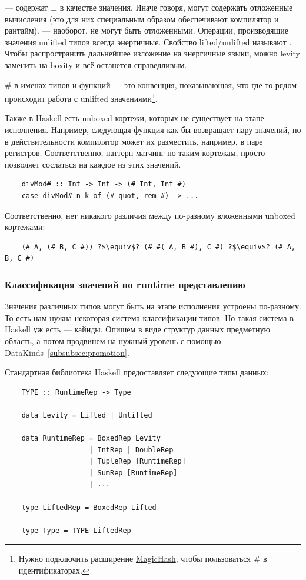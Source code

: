  --- содержат $\bot$ в качестве значения.
Иначе говоря, могут содержать отложенные вычисления (это для них специальным образом обеспечивают компилятор и рантайм).
 --- наоборот, не могут быть отложенными.
Операции, производящие значения unlifted типов всегда энергичные.
Свойство lifted/unlifted называют .
Чтобы распространить дальнейшее изложение на энергичные языки, можно levity заменить на boxity и всё останется справедливым.

\# в именах типов и функций --- это конвенция, показывающая, что где-то рядом происходит работа с unlifted значениями\footnote{Нужно подключить расширение \href{https://ghc.gitlab.haskell.org/ghc/doc/users_guide/exts/magic_hash.html}{MagicHash}, чтобы пользоваться \# в идентификаторах.}.

Также в Haskell есть unboxed кортежи, которых не существует на этапе исполнения.
Например, следующая функция как бы возвращает пару значений, но в действительности компилятор может их разместить, например, в паре регистров.
Соответственно, паттерн-матчинг по таким кортежам, просто позволяет сослаться на каждое из этих значений.
\begin{verbatim}
    divMod# :: Int -> Int -> (# Int, Int #)
    case divMod# n k of (# quot, rem #) -> ...
\end{verbatim}
Соответственно, нет никакого различия между по-разному вложенными unboxed кортежами:
\begin{verbatim}
    (# A, (# B, C #)) ?$\equiv$? (# #( A, B #), C #) ?$\equiv$? (# A, B, C #)
\end{verbatim}

\subsubsection{Классификация значений по runtime представлению}

Значения различных типов могут быть на этапе исполнения устроены по-разному.
То есть нам нужна некоторая система классификации типов.
Но такая система в Haskell уж есть --- кайнды.
Опишем в виде структур данных предметную область, а потом продвинем на нужный уровень с помощью DataKinds~\ref{subsubsec:promotion}.

Стандартная библиотека Haskell \href{https://downloads.haskell.org/ghc/latest/docs/users_guide/exts/representation_polymorphism.html}{предоставляет} следующие типы данных:
\begin{verbatim}
    TYPE :: RuntimeRep -> Type

    data Levity = Lifted | Unlifted

    data RuntimeRep = BoxedRep Levity
                    | IntRep | DoubleRep
                    | TupleRep [RuntimeRep]
                    | SumRep [RuntimeRep]
                    | ...

    type LiftedRep = BoxedRep Lifted

    type Type = TYPE LiftedRep
\end{verbatim}

